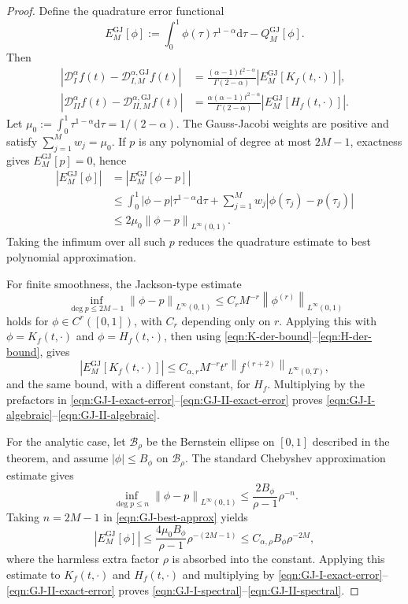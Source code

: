 \documentclass[preprint,3p,times]{elsarticle}
\newcommand{\norm}[1]{\left\lVert #1\right\rVert}
\newcommand{\abs}[1]{\left\lvert #1\right\rvert}
\def\d{\mathrm{d}}
\begin{document}
\begin{proof}
Define the quadrature error functional
\[
    E_M^{\mathrm{GJ}}[\phi]
    :=\int_0^1\phi(\tau)\tau^{1-\alpha}\d\tau-Q_M^{\mathrm{GJ}}[\phi].
\]
Then
\begin{align}
\abs{\mathcal D_I^\alpha f(t)-\mathcal D_{I,M}^{\alpha,\mathrm{GJ}}f(t)}
&=\frac{(\alpha-1)t^{2-\alpha}}{\Gamma(2-\alpha)}
\abs{E_M^{\mathrm{GJ}}[K_f(t,\cdot)]},\label{eqn:GJ-I-exact-error}\\
\abs{\mathcal D_{II}^\alpha f(t)-\mathcal D_{II,M}^{\alpha,\mathrm{GJ}}f(t)}
&=\frac{\alpha(\alpha-1)t^{2-\alpha}}{\Gamma(2-\alpha)}
\abs{E_M^{\mathrm{GJ}}[H_f(t,\cdot)]}.\label{eqn:GJ-II-exact-error}
\end{align}
Let $\mu_0:=\int_0^1\tau^{1-\alpha}\d\tau=1/(2-\alpha)$. The Gauss-Jacobi weights are positive and satisfy $\sum_{j=1}^Mw_j=\mu_0$. If $p$ is any polynomial of degree at most $2M-1$, exactness gives $E_M^{\mathrm{GJ}}[p]=0$, hence
\begin{align}
    \abs{E_M^{\mathrm{GJ}}[\phi]}
    &=\abs{E_M^{\mathrm{GJ}}[\phi-p]}\nonumber\\
    &\le\int_0^1\abs{\phi-p}\tau^{1-\alpha}\d\tau
       +\sum_{j=1}^Mw_j\abs{\phi(\tau_j)-p(\tau_j)}\nonumber\\
    &\le2\mu_0\norm{\phi-p}_{L^\infty(0,1)}.
    \label{eqn:GJ-best-approx}
\end{align}
Taking the infimum over all such $p$ reduces the quadrature estimate to best polynomial approximation.

For finite smoothness, the Jackson-type estimate
\[
    \inf_{\deg p\le 2M-1}\norm{\phi-p}_{L^\infty(0,1)}
    \le C_rM^{-r}\norm{\phi^{(r)}}_{L^\infty(0,1)}
\]
holds for $\phi\in C^r([0,1])$, with $C_r$ depending only on $r$. Applying this with $\phi=K_f(t,\cdot)$ and $\phi=H_f(t,\cdot)$, then using \eqref{eqn:K-der-bound}--\eqref{eqn:H-der-bound}, gives
\[
    \abs{E_M^{\mathrm{GJ}}[K_f(t,\cdot)]}
    \le C_{\alpha,r}M^{-r}t^r\norm{f^{(r+2)}}_{L^\infty(0,T)},
\]
and the same bound, with a different constant, for $H_f$. Multiplying by the prefactors in \eqref{eqn:GJ-I-exact-error}--\eqref{eqn:GJ-II-exact-error} proves \eqref{eqn:GJ-I-algebraic}--\eqref{eqn:GJ-II-algebraic}.

For the analytic case, let $\mathcal B_\rho$ be the Bernstein ellipse on $[0,1]$ described in the theorem, and assume $\abs{\phi}\le B_\phi$ on $\mathcal B_\rho$. The standard Chebyshev approximation estimate gives
\[
    \inf_{\deg p\le n}\norm{\phi-p}_{L^\infty(0,1)}
    \le \frac{2B_\phi}{\rho-1}\rho^{-n}.
\]
Taking $n=2M-1$ in \eqref{eqn:GJ-best-approx} yields
\[
    \abs{E_M^{\mathrm{GJ}}[\phi]}
    \le \frac{4\mu_0B_\phi}{\rho-1}\rho^{-(2M-1)}
    \le C_{\alpha,\rho}B_\phi\rho^{-2M},
\]
where the harmless extra factor $\rho$ is absorbed into the constant. Applying this estimate to $K_f(t,\cdot)$ and $H_f(t,\cdot)$ and multiplying by \eqref{eqn:GJ-I-exact-error}--\eqref{eqn:GJ-II-exact-error} proves \eqref{eqn:GJ-I-spectral}--\eqref{eqn:GJ-II-spectral}.
\end{proof}
\end{document}
